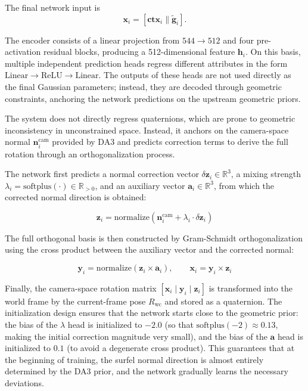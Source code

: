 \documentclass[lettersize,journal]{IEEEtran}
\begin{document}
The final network input is
\begin{equation}
\mathbf{x}_i = [\mathbf{ctx}_i \| \tilde{\mathbf{g}}_i].
\end{equation}

The encoder consists of a linear projection from $544 \to 512$ and four pre-activation residual blocks, producing a 512-dimensional feature $\mathbf{h}_i$. On this basis, multiple independent prediction heads regress different attributes in the form $\text{Linear} \to \text{ReLU} \to \text{Linear}$. The outputs of these heads are not used directly as the final Gaussian parameters; instead, they are decoded through geometric constraints, anchoring the network predictions on the upstream geometric priors.

 The system does not directly regress quaternions, which are prone to geometric inconsistency in unconstrained space. Instead, it anchors on the camera-space normal $\mathbf{n}_i^{\text{cam}}$ provided by DA3 and predicts correction terms to derive the full rotation through an orthogonalization process.

The network first predicts a normal correction vector $\delta \mathbf{z}_i \in \mathbb{R}^3$, a mixing strength $\lambda_i = \text{softplus}(\cdot) \in \mathbb{R}_{>0}$, and an auxiliary vector $\mathbf{a}_i \in \mathbb{R}^3$, from which the corrected normal direction is obtained:

\begin{equation}
\mathbf{z}_i = \text{normalize}(\mathbf{n}_i^{\text{cam}} + \lambda_i \cdot \delta \mathbf{z}_i)
\end{equation}

The full orthogonal basis is then constructed by Gram-Schmidt orthogonalization using the cross product between the auxiliary vector and the corrected normal:

\begin{equation}
\mathbf{y}_i = \text{normalize}(\mathbf{z}_i \times \mathbf{a}_i), \qquad \mathbf{x}_i = \mathbf{y}_i \times \mathbf{z}_i
\end{equation}

Finally, the camera-space rotation matrix $[\mathbf{x}_i \mid \mathbf{y}_i \mid \mathbf{z}_i]$ is transformed into the world frame by the current-frame pose $R_{\text{wc}}$ and stored as a quaternion. The initialization design ensures that the network starts close to the geometric prior: the bias of the $\lambda$ head is initialized to $-2.0$ (so that $\text{softplus}(-2) \approx 0.13$, making the initial correction magnitude very small), and the bias of the $\mathbf{a}$ head is initialized to $0.1$ (to avoid a degenerate cross product). This guarantees that at the beginning of training, the surfel normal direction is almost entirely determined by the DA3 prior, and the network gradually learns the necessary deviations.
\end{document}
